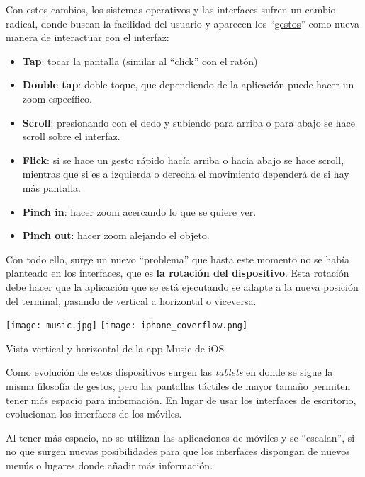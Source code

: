 Con estos cambios, los sistemas operativos y las interfaces sufren un cambio radical, donde buscan la facilidad del usuario y aparecen los “\href{https://en.wikipedia.org/wiki/Pointing_device_gesture#Touchpad_and_touchscreen_gestures}{gestos}” como nueva manera de interactuar con el interfaz:
\begin{itemize}
    \item \textbf{Tap}: tocar la pantalla (similar al “click” con el ratón)
    \item \textbf{Double tap}: doble toque, que dependiendo de la aplicación puede hacer un zoom específico.
    \item \textbf{Scroll}: presionando con el dedo y subiendo para arriba o para abajo se hace scroll sobre el interfaz.
    \item \textbf{Flick}: si se hace un gesto rápido hacía arriba o hacia abajo se hace scroll, mientras que si es a izquierda o derecha el movimiento dependerá de si hay más pantalla.
    \item \textbf{Pinch in}: hacer zoom acercando lo que se quiere ver.
    \item \textbf{Pinch out}: hacer zoom alejando el objeto.
\end{itemize}

Con todo ello, surge un nuevo “problema” que hasta este momento no se había planteado en los interfaces, que es \textbf{la rotación del dispositivo}. Esta rotación debe hacer que la aplicación que se está ejecutando se adapte a la nueva posición del terminal, pasando de vertical a horizontal o viceversa.


{
    \hfill
    \texttt{[image: music.jpg]}
    \hfill
    \texttt{[image: iphone\_coverflow.png]}
    \hfill
}
\vspace{-25pt}
\begin{center}
    {\scriptsize  Vista vertical y horizontal de la app Music de iOS}
\end{center}


Como evolución de estos dispositivos surgen las \textit{tablets} en donde se sigue la misma filosofía de gestos, pero las pantallas táctiles de mayor tamaño permiten tener más espacio para información. En lugar de usar los interfaces de escritorio, evolucionan los interfaces de los móviles.


Al tener más espacio, no se utilizan las aplicaciones de móviles y se “escalan”, si no que surgen nuevas posibilidades para que los interfaces dispongan de nuevos menús o lugares donde añadir más información.


